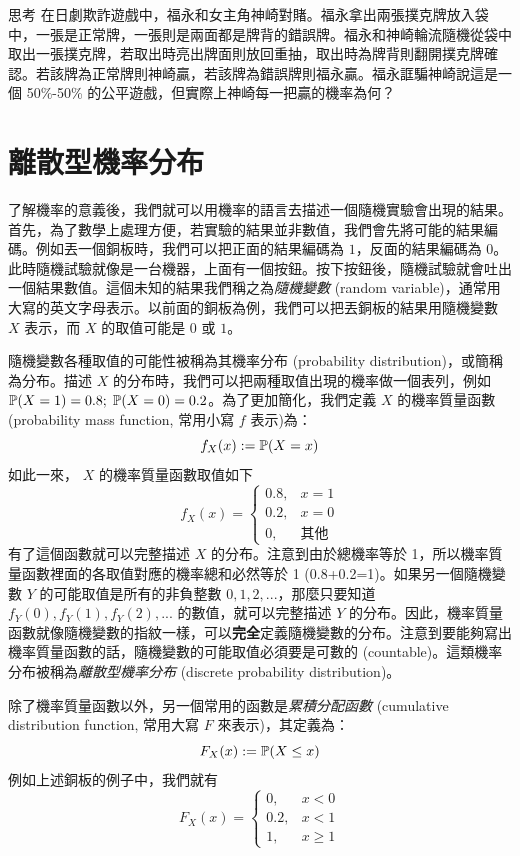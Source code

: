     \bigskip
    
    \begin{custom}{思考}
        在日劇欺詐遊戲中，福永和女主角神崎對賭。福永拿出兩張撲克牌放入袋中，一張是正常牌，一張則是兩面都是牌背的錯誤牌。福永和神崎輪流隨機從袋中取出一張撲克牌，若取出時亮出牌面則放回重抽，取出時為牌背則翻開撲克牌確認。若該牌為正常牌則神崎贏，若該牌為錯誤牌則福永贏。福永誆騙神崎說這是一個 50\%-50\% 的公平遊戲，但實際上神崎每一把贏的機率為何？
    \end{custom}

\section{離散型機率分布}

    了解機率的意義後，我們就可以用機率的語言去描述一個隨機實驗會出現的結果。首先，為了數學上處理方便，若實驗的結果並非數值，我們會先將可能的結果編碼。例如丟一個銅板時，我們可以把正面的結果編碼為 $1$，反面的結果編碼為 $0$。此時隨機試驗就像是一台機器，上面有一個按鈕。按下按鈕後，隨機試驗就會吐出一個結果數值。這個未知的結果我們稱之為\textit{隨機變數} (random variable)，通常用大寫的英文字母表示。以前面的銅板為例，我們可以把丟銅板的結果用隨機變數 $X$ 表示，而 $X$ 的取值可能是 $0$ 或 $1$。
    
    隨機變數各種取值的可能性被稱為其機率分布 (probability distribution)，或簡稱為分布。描述 $X$ 的分布時，我們可以把兩種取值出現的機率做一個表列，例如 $\mathbb{P}(X = 1) = 0.8;\; \mathbb{P}(X = 0) = 0.2$。為了更加簡化，我們定義 $X$ 的機率質量函數 (probability mass function, 常用小寫 $f$ 表示)為：
    \[f_X(x) := \mathbb{P}(X = x)\]
    如此一來， $X$ 的機率質量函數取值如下
    \[f_X(x) = \left\{\begin{array}{rl}
            0.8, & x = 1\\
            0.2, & x = 0\\
            0, & \text{其他}
        \end{array}\right.\]
    有了這個函數就可以完整描述 $X$ 的分布。注意到由於總機率等於 1，所以機率質量函數裡面的各取值對應的機率總和必然等於 1 (0.8+0.2=1)。如果另一個隨機變數 $Y$ 的可能取值是所有的非負整數 $0, 1, 2, ...$，那麼只要知道 $f_Y(0), f_Y(1), f_Y(2), ...$ 的數值，就可以完整描述 $Y$ 的分布。因此，機率質量函數就像隨機變數的指紋一樣，可以\textbf{完全}定義隨機變數的分布。注意到要能夠寫出機率質量函數的話，隨機變數的可能取值必須要是可數的 (countable)。這類機率分布被稱為\textit{離散型機率分布} (discrete probability distribution)。
    
    除了機率質量函數以外，另一個常用的函數是\textit{累積分配函數} (cumulative distribution function, 常用大寫 $F$ 來表示)，其定義為：
    \[F_X(x) := \mathbb{P}(X \le x)\]
    例如上述銅板的例子中，我們就有
    \[F_X(x) = \left\{\begin{array}{rl}
        0, & x < 0\\
        0.2, & x < 1\\
        1, & x \ge 1
    \end{array}\right.\]
    
